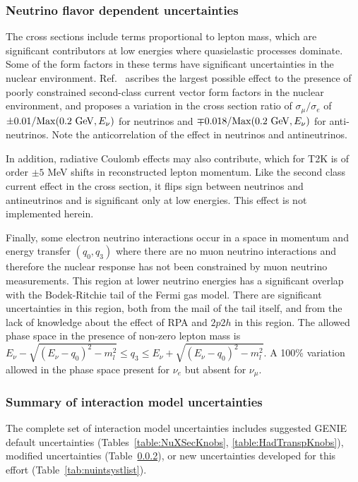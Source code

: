 \subsubsection{Neutrino flavor dependent uncertainties}
The cross sections include terms proportional to lepton mass, which are significant contributors at low energies where quasielastic processes dominate.  Some of the form factors in these terms have significant uncertainties in the nuclear environment.  Ref.~\cite{Day-McFarland:2012} ascribes the largest possible effect to the presence of poorly constrained second-class current vector form factors in the nuclear environment, and proposes a variation in the cross section ratio of $\sigma_\mu/\sigma_e$ of $\pm 0.01/{\rm\textstyle Max}(0.2~{\rm\textstyle GeV},E_\nu)$ for neutrinos and $\mp 0.018/{\rm\textstyle Max}(0.2~ {\rm\textstyle GeV},E_\nu)$ for anti-neutrinos.  Note the anticorrelation of the effect in neutrinos and antineutrinos.    

In addition, radiative Coulomb effects may also contribute, which for T2K is of order $\pm5$ MeV shifts in reconstructed lepton momentum.  Like the second class current effect in the cross section, it flips sign between neutrinos and antineutrinos and is significant only at low energies.  This effect is not implemented herein.

Finally, some electron neutrino interactions occur in a space in momentum and energy transfer $(q_0,q_3)$ where there are no muon neutrino interactions and therefore the nuclear response has not been constrained by muon neutrino measurements.  This region at lower neutrino energies has a significant overlap with the Bodek-Ritchie tail of the Fermi gas model.  There are significant uncertainties in this region, both from the mail of the tail itself, and from the lack of knowledge about the effect of RPA and $2p2h$ in this region.  The allowed phase space in the presence of non-zero lepton mass is $E_\nu-\sqrt{\left( E_\nu-q_0\right) ^2-m_l^2}\leq q_3\leq E_\nu+\sqrt{\left( E_\nu-q_0\right) ^2-m_l^2}$.  A 100\% variation allowed in the phase space present for $\nu_e$ but absent for $\nu_\mu$. \\ 

\subsubsection{Summary of interaction model uncertainties}

The complete set of interaction model uncertainties includes suggested GENIE default uncertainties (Tables~\ref{table:NuXSecKnobs}, %
\ref{table:HadTranspKnobs}),  modified uncertainties (Table~\ref{}), or new uncertainties developed for this effort (Table~\ref{tab:nuintsystlist}). 

